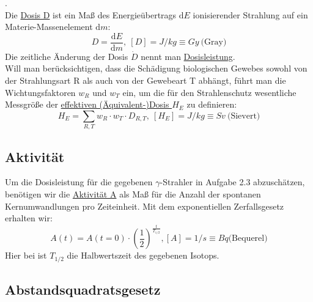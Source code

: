 \begin{definition}[Dosisgrößen].\\
	Die \underline{Dosis D} ist ein Maß des Energieübertrags $\mathrm{d}E$ ionisierender Strahlung 		auf ein Materie-Massenelement $\mathrm{d}m$:
\begin{equation}\label{eq:dosis}
	D = \frac{\mathrm{d}E}{\mathrm{d}m},\ [D] = J/kg \equiv Gy\ \textrm{(Gray)}
\end{equation}
Die zeitliche Änderung der Dosis $\dot{D}$ nennt man \underline{Dosisleistung}.\\
Will man berücksichtigen, dass die Schädigung biologischen Gewebes sowohl von der Strahlungsart R als auch von der Gewebeart T abhängt, führt man die Wichtungsfaktoren $w_R$ und $w_T$ ein, um die für den Strahlenschutz wesentliche Messgröße der \underline{effektiven (Äquivalent-)Dosis $H_E$} zu definieren:
\begin{equation}
	H_E = \sum_{R,T} w_R \cdot w_T \cdot D_{R,T},\ [H_E]=J/kg \equiv Sv\ \textrm{(Sievert)}
\end{equation}
\end{definition}

\subsection{Aktivität}
Um die Dosisleistung für die gegebenen $\gamma$-Strahler in Aufgabe 2.3 abzuschätzen, benötigen wir die \underline{Aktivität A} als Maß für die Anzahl der spontanen Kernumwandlungen pro Zeiteinheit. Mit dem exponentiellen Zerfallsgesetz erhalten wir:
\begin{equation} \label{eq:aktivitaet}
	A(t)=A(t=0) \cdot \left(\frac{1}{2}\right)^{\frac{t}{T_{1/2}}}, [A] = 1/s \equiv Bq \textrm{(Bequerel)}
\end{equation}
Hier bei ist $T_{1/2}$ die Halbwertszeit des gegebenen Isotops.

\subsection{Abstandsquadratsgesetz}

